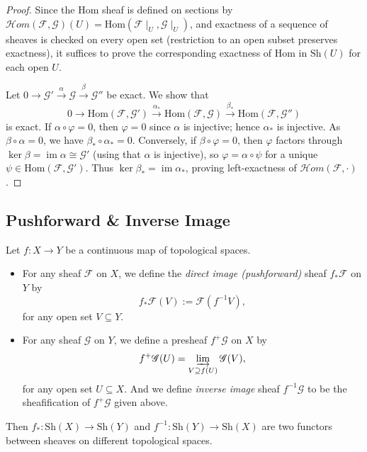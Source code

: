 \documentclass[11pt]{article}
\begin{document}
\begin{proof}
  Since the Hom sheaf is defined on sections by
  $\mathscr{H}{om}(\mathscr{F},\mathscr{G})(U)=\mathrm{Hom}(\mathscr{F}\mid_U,\mathscr{G}\mid_U)$,
  and exactness of a sequence of sheaves is checked on every open set (restriction to an open subset preserves exactness), it suffices to prove the corresponding exactness of $\mathrm{Hom}$ in $\mathrm{Sh}(U)$ for each open $U$.

  Let $0\to\mathscr{G}'\xrightarrow{\alpha}\mathscr{G}\xrightarrow{\beta}\mathscr{G}''$ be exact. We show that
  \[
    0\to\mathrm{Hom}(\mathscr{F},\mathscr{G}')\xrightarrow{\alpha_*}\mathrm{Hom}(\mathscr{F},\mathscr{G})\xrightarrow{\beta_*}\mathrm{Hom}(\mathscr{F},\mathscr{G}'')
  \]
  is exact. If $\alpha\circ\varphi=0$, then $\varphi=0$ since $\alpha$ is injective; hence $\alpha_*$ is injective. As $\beta\circ\alpha=0$, we have $\beta_*\circ\alpha_*=0$. Conversely, if $\beta\circ\varphi=0$, then $\varphi$ factors through $\ker\beta=\operatorname{im}\alpha\cong\mathscr{G}'$ (using that $\alpha$ is injective), so $\varphi=\alpha\circ\psi$ for a unique $\psi\in\mathrm{Hom}(\mathscr{F},\mathscr{G}')$. Thus $\ker\beta_*=\operatorname{im}\alpha_*$, proving left-exactness of $\mathscr{H}{om}(\mathscr{F},\cdot)$.
\end{proof}


\subsection{Pushforward \& Inverse Image}

\begin{definition}
  Let $f: X \to Y$ be a continuous map of topological spaces.
  \begin{itemize}
    \item For any sheaf $ \mathscr{F} $ on $ X $, we define the \emph{direct image (pushforward)} 
    sheaf $ f_{*}\mathscr{F} $ on $ Y $ by $$ f_{*}\mathscr{F}(V):=\mathscr{F}(f^{-1}V),$$ 
    for any open set $ V \subseteq Y $. 
    \item For any sheaf $ \mathscr{G} $ on $ Y $, we define a  
    presheaf 
    $ f^{+}\mathscr{G} $ on $ X $ by $$ f^{+}\mathscr{G}(U)=
    \varinjlim_{V \supseteq f(U)} \mathscr{G}(V),$$ 
    for any open set $ U \subseteq X $. And we define \emph{inverse image} 
    sheaf $ f^{-1}\mathscr{G} $ to be the sheafification of $ f^{+}\mathscr{G} $ given above.  
  \end{itemize}

  Then $f_{*}:\mathrm{Sh}(X) \to \mathrm{Sh}(Y)$ and $f^{-1}:\mathrm{Sh}(Y) \to \mathrm{Sh}(X)$ 
  are two functors between sheaves on different topological spaces. 
\end{definition}
\end{document}
